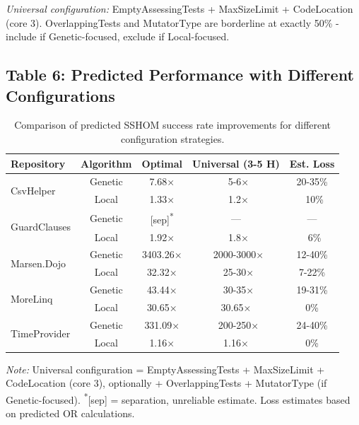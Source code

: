 \documentclass{article}
\begin{document}
\textit{Universal configuration:} EmptyAssessingTests + MaxSizeLimit + CodeLocation (core 3). OverlappingTests and MutatorType are borderline at exactly 50\% - include if Genetic-focused, exclude if Local-focused.


\subsection*{Table 6: Predicted Performance with Different Configurations}

\begin{table}[h]
\centering
\small
\caption{Comparison of predicted SSHOM success rate improvements for different configuration strategies.}
\label{tab:performance}
\begin{tabular}{@{}lcccc@{}}
\toprule
\textbf{Repository} & \textbf{Algorithm} & \textbf{Optimal} & \textbf{Universal (3-5 H)} & \textbf{Est. Loss} \\
\midrule
\multirow{2}{*}{CsvHelper} 
  & Genetic & 7.68×    & ~5-6×   & 20-35\% \\
  & Local   & 1.33×    & ~1.2×   & ~10\% \\
\midrule
\multirow{2}{*}{GuardClauses} 
  & Genetic & [sep]\textsuperscript{*} & ---     & --- \\
  & Local   & 1.92×    & ~1.8×   & ~6\% \\
\midrule
\multirow{2}{*}{Marsen.Dojo} 
  & Genetic & 3403.26× & ~2000-3000× & 12-40\% \\
  & Local   & 32.32×   & ~25-30× & 7-22\% \\
\midrule
\multirow{2}{*}{MoreLinq} 
  & Genetic & 43.44×   & ~30-35× & 19-31\% \\
  & Local   & 30.65×   & 30.65×  & 0\% \\
\midrule
\multirow{2}{*}{TimeProvider} 
  & Genetic & 331.09×  & ~200-250× & 24-40\% \\
  & Local   & 1.16×    & 1.16×   & 0\% \\
\bottomrule
\end{tabular}
\end{table}

\textit{Note:} Universal configuration = EmptyAssessingTests + MaxSizeLimit + CodeLocation (core 3), optionally + OverlappingTests + MutatorType (if Genetic-focused). \textsuperscript{*}[sep] = separation, unreliable estimate. Loss estimates based on predicted OR calculations.
\end{document}
